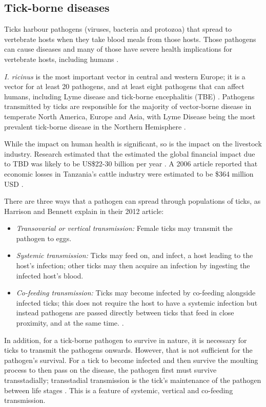 \documentclass{article}
\begin{document}
\subsection{Tick-borne diseases}

Ticks harbour pathogens (viruses, bacteria and protozoa) that spread to vertebrate hosts when they take blood meals from those hosts. Those pathogens can cause diseases and many of those have severe health implications for vertebrate hosts, including humans \cite{Johnson2023e}.

\textit{I. ricinus} is the most important vector in central and western Europe; it is a vector for at least 20 pathogens, and at least eight pathogens that can affect humans, including Lyme disease and tick-borne encephalitis (TBE) \cite{Gray2024}. Pathogens transmitted by ticks are responsible for the majority of vector-borne disease in temperate North America, Europe and Asia, with Lyme Disease being the most prevalent tick-borne disease in the Northern Hemisphere \cite{Rochlin2020}. 

While the impact on human health is significant, so is the impact on the livestock industry. Research estimated that the estimated the global financial impact due to TBD was likely to be US\$22-30 billion per year \cite{Lew_Tabor_2016}. A 2006 article reported that economic losses in Tanzania's cattle industry were estimated to be \$364 million USD \cite{Kivaria2006}.

There are three ways that a pathogen can spread through populations of ticks, as Harrison and Bennett explain in their 2012 article:
\begin{itemize}
	\item \textit{Transovarial or vertical transmission:} Female ticks may transmit the pathogen to eggs.
	\item \textit{Systemic transmission:} Ticks may feed on, and infect, a host leading to the host's infection; other ticks may then acquire an infection by ingesting the infected host's blood.
	\item \textit{Co-feeding transmission:} Ticks may become infected by co-feeding alongside infected ticks; this does not require the host to have a systemic infection but instead pathogens are passed directly between ticks that feed in close proximity, and at the same time. \cite{HARRISON2012}.
\end{itemize}

In addition, for a tick-borne pathogen to survive in nature, it is necessary for ticks to transmit the pathogens onwards. However, that is not sufficient for the pathogen's survival. For a tick to become infected and then survive the moulting process to then pass on the disease, the pathogen first must survive transstadially; transstadial transmission is the tick's maintenance of the pathogen between life stages \cite{Johnson2023d}. This is a feature of systemic, vertical and co-feeding transmission.
\end{document}
